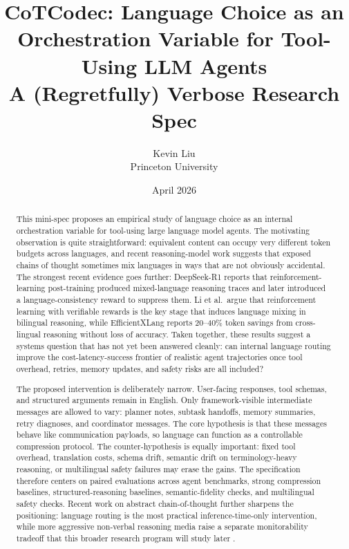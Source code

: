 \documentclass[11pt]{article}
\title{\vspace{-1.5em}\textbf{CoTCodec: Language Choice as an Orchestration Variable for Tool-Using LLM Agents}\\[0.35em]\large A (Regretfully) Verbose Research Spec}
\author{Kevin Liu\\Princeton University}
\date{April 2026}
\begin{document}
\maketitle

\begin{abstract}
This mini-spec proposes an empirical study of language choice as an internal orchestration variable for tool-using large language model agents. The motivating observation is quite straightforward: equivalent content can occupy very different token budgets across languages, and recent reasoning-model work suggests that exposed chains of thought sometimes mix languages in ways that are not obviously accidental. The strongest recent evidence goes further: DeepSeek-R1 reports that reinforcement-learning post-training produced mixed-language reasoning traces and later introduced a language-consistency reward to suppress them. Li et al.\ argue that reinforcement learning with verifiable rewards is the key stage that induces language mixing in bilingual reasoning, while EfficientXLang reports 20--40\% token savings from cross-lingual reasoning without loss of accuracy. Taken together, these results suggest a systems question that has not yet been answered cleanly: can internal language routing improve the cost-latency-success frontier of realistic agent trajectories once tool overhead, retries, memory updates, and safety risks are all included?

The proposed intervention is deliberately narrow. User-facing responses, tool schemas, and structured arguments remain in English. Only framework-visible intermediate messages are allowed to vary: planner notes, subtask handoffs, memory summaries, retry diagnoses, and coordinator messages. The core hypothesis is that these messages behave like communication payloads, so language can function as a controllable compression protocol. The counter-hypothesis is equally important: fixed tool overhead, translation costs, schema drift, semantic drift on terminology-heavy reasoning, or multilingual safety failures may erase the gains. The specification therefore centers on paired evaluations across agent benchmarks, strong compression baselines, structured-reasoning baselines, semantic-fidelity checks, and multilingual safety checks. Recent work on abstract chain-of-thought further sharpens the positioning: language routing is the most practical inference-time-only intervention, while more aggressive non-verbal reasoning media raise a separate monitorability tradeoff that this broader research program will study later \cite{ramji2026abstractcot,baker2025monitoring,metr2025cotinformative}.
\end{abstract}
\end{document}
